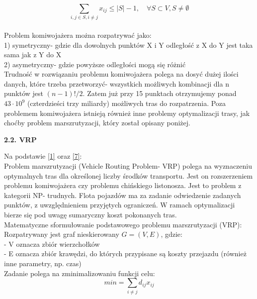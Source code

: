 \documentclass[a4paper, twoside, 12pt, justified]{article}
\begin{document}
	  \begin{equation}
	  	  {\sum\limits_{i,j \in S, i \neq j} x_{ij} \leq |S| - 1, \quad \forall S \subset V, S \neq \emptyset }
	  \end{equation}\\
	
	
	
	Problem komiwojażera można rozpatrywać jako:\\
	1) symetryczny- gdzie dla dowolnych punktów X i Y odległość z X do Y jest taka sama jak z Y do X\\
	2) asymetryczny- gdzie powyższe odległości mogą się różnić\\
	
	Trudność w rozwiązaniu problemu komiwojażera polega na dosyć dużej ilości danych, które trzeba przetworzyć- wszystkich możliwych kombinacji dla n punktów jest $(n-1)!/2$. Zatem już przy 15 punktach otrzymujemy ponad $43\cdot10^9$ (czterdzieści trzy miliardy) możliwych tras do rozpatrzenia. Poza problemem komiwojażera istnieją również inne problemy optymalizacji trasy, jak choćby problem marszrutyzacji, który został opisany poniżej.
	
	\begin{flushleft}
		\begin{large}
			\textbf{2.2. VRP}
		\end{large}
	\end{flushleft}
	\vspace{5mm} %
	
	Na podstawie \hyperlink{vrp_all}{[1]} oraz \hyperlink{vrp_solving}{[7]}:\\
	Problem marszrutyzacji (Vehicle Routing Problem- VRP) polega na wyznaczeniu optymalnych tras dla określonej liczby środków transportu. Jest on rozszerzeniem problemu komiwojażera czy problemu chińskiego listonosza. Jest to problem z kategorii NP- trudnych. Flota pojazdów ma za zadanie odwiedzenie zadanych punktów, z uwzględnieniem przyjętych ograniczeń. W ramach optymalizacji bierze się pod uwagę sumaryczny koszt pokonanych tras. \\
	Matematyczne sformułowanie podstawowego problemu marszrutyzacji (VRP):\\
	Rozpatrywany jest graf nieskierowany $G=(V,E)$, gdzie:\\
	- V oznacza zbiór wierzchołków\\ 
	- E oznacza zbiór krawędzi, do których przypisane są koszty przejazdu (również inne parametry, np. czas)
	\\
	Zadanie polega na zminimalizowaniu funkcji celu:
	\begin{equation}
	{min =\sum\limits_{i \neq j} d_{ij} x_{ij} }
	\end{equation}
	
\end{document}
